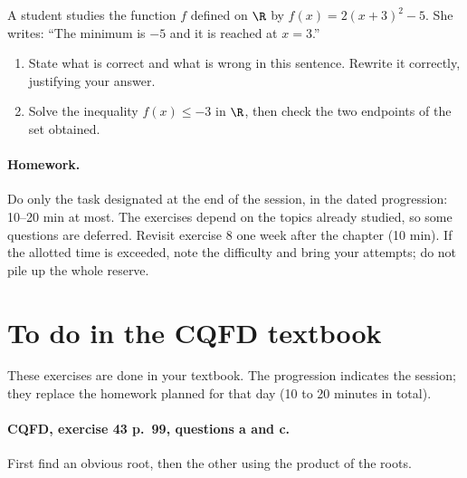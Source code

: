 A student studies the function $f$ defined on $\R$ by $f(x)=2(x+3)^2-5$. She writes: ``The minimum is $-5$ and it is reached at $x=3$.''
\begin{enumerate}[label=\arabic*.]
\item State what is correct and what is wrong in this sentence. Rewrite it correctly, justifying your answer.
\item Solve the inequality $f(x)\leq-3$ in $\R$, then check the two endpoints of the set obtained.
\end{enumerate}
\paragraph{Homework.} Do only the task designated at the end of the session, in the dated progression: 10--20 min at most. The exercises depend on the topics already studied, so some questions are deferred. Revisit exercise 8 one week after the chapter (10 min). If the allotted time is exceeded, note the difficulty and bring your attempts; do not pile up the whole reserve.
\endgroup
{}\section*{To do in the CQFD textbook}
These exercises are done in your textbook. The progression indicates the session; they replace the homework planned for that day (10 to 20 minutes in total).
\paragraph{CQFD, exercise 43 p.~99, questions a and c.}\label{C02-M1} First find an obvious root, then the other using the product of the roots.
